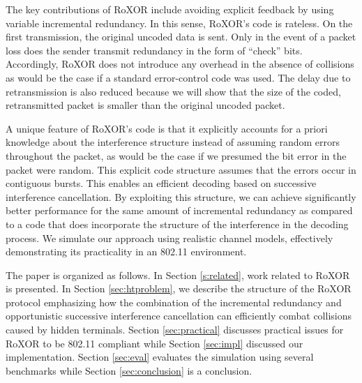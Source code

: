 The key contributions of RoXOR include avoiding explicit feedback by using variable incremental redundancy. In this sense, RoXOR's code is rateless. On the first transmission, the original uncoded data is sent. Only in the event of a packet loss does the sender transmit redundancy in the form of ``check'' bits. Accordingly, RoXOR does not introduce any overhead in the absence of collisions as would be the case if a standard error-control code was used. 
The delay due to retransmission is also reduced because  we will show that the size of the coded, retransmitted packet is smaller than the original uncoded packet.

A unique feature of RoXOR's code is that it explicitly accounts for a priori knowledge about the interference structure instead of assuming random errors throughout the packet, as would be the case if we presumed the bit error in the packet were random. This explicit code structure assumes that the errors occur in contiguous bursts. This enables an efficient decoding based on successive interference cancellation. By exploiting this structure, we can achieve significantly better performance for the same amount of incremental redundancy as compared to a code that does incorporate the structure of the interference in the decoding process.  We simulate our approach using realistic channel models, effectively demonstrating its practicality in an 802.11 environment.

The paper is organized as follows. In Section \ref{s:related}, work related to RoXOR is presented. In Section \ref{sec:htproblem}, we describe the structure of the RoXOR protocol emphasizing how the combination of the incremental 
redundancy and opportunistic successive interference cancellation can efficiently combat collisions caused by hidden terminals. Section \ref{sec:practical} discusses practical issues for RoXOR to be 802.11 compliant while Section 
\ref{sec:impl} discussed our implementation. Section \ref{sec:eval} evaluates the simulation using several benchmarks while Section \ref{sec:conclusion} is a conclusion.